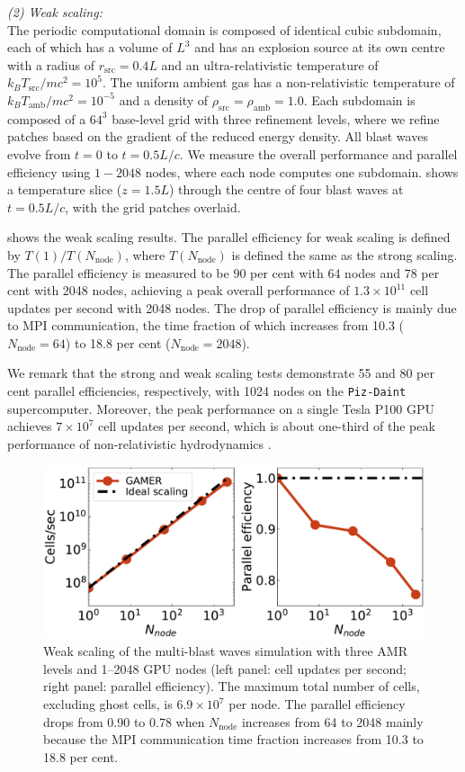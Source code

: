     \emph{(2) Weak scaling:}\\
    The periodic computational domain is composed of identical cubic subdomain, each of which has a volume of $L^3$ and has an explosion source at its own centre with a radius of $r_{\text{src}}=0.4L$ and an ultra-relativistic temperature of $k_{B}T_{\text{src}}/mc^2=10^{5}$. The uniform ambient gas has a non-relativistic temperature of $k_{B}T_{\text{amb}}/mc^2=10^{-5}$ and a density of $\rho_{\text{src}}=\rho_{\text{amb}}=1.0$. Each subdomain is composed of a $64^3$ base-level grid with three refinement levels, where we refine patches based on the gradient of the reduced energy density. All blast waves evolve from $t=0$ to $t=0.5L/c$. We measure the overall performance and parallel efficiency using $1-2048$ nodes, where each node computes one subdomain.  shows a temperature slice ($z=1.5L$) through the centre of four blast waves at $t=0.5L/c$, with the grid patches overlaid.

 shows the weak scaling results. The parallel efficiency for weak scaling is defined by $T(1)/T(N_{\text{node}})$, where $T(N_{\text{node}})$ is defined the same as the strong scaling. The parallel efficiency is measured to be 90 per cent with 64 nodes and 78 per cent with 2048 nodes, achieving a peak overall performance of $1.3\times 10^{11}$ cell updates per second with 2048 nodes. The drop of parallel efficiency is mainly due to MPI communication, the time fraction of which increases from 10.3 ($N_{\text{node}}=64$) to 18.8 per cent ($N_{\text{node}}=2048$).

We remark that the strong and weak scaling tests demonstrate 55 and 80 per cent parallel efficiencies, respectively, with 1024 nodes on the \texttt{Piz-Daint} supercomputer. Moreover, the peak performance on a single Tesla P100 GPU achieves $7\times 10^{7}$ cell updates per second, which is about one-third of the peak performance of non-relativistic hydrodynamics \citep{gamer-2}.


\begin{figure}
\includegraphics[width=\columnwidth]{figures/fig__benchmark_weakscaling.pdf}
\caption{Weak scaling of the multi-blast waves simulation with three AMR levels and 1--2048 GPU nodes (left panel: cell updates per second; right panel: parallel efficiency). The maximum total number of cells, excluding ghost cells, is $6.9\times 10^{7}$ per node. The parallel efficiency drops from 0.90 to 0.78 when $N_{\text{node}}$ increases from 64 to 2048 mainly because the MPI communication time fraction increases from 10.3 to 18.8 per cent.}
\label{fig:weak scaling}
\end{figure}





